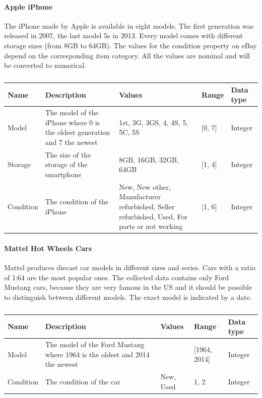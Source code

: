 \paragraph{Apple iPhone}
The iPhone made by Apple is available in eight models. The first generation was released in 2007, the last model 5s in 2013. Every model comes with different storage sizes (from 8GB to 64GB). The values for the condition property on eBay depend on the corresponding item category. All the values are nominal and will be converted to numerical.
\begin{table}[h!]
	\begin{center}
	\begin{tabular}{| l | p{5cm} | p{4cm} | l | l |}
		\hline
		Name & Description & Values & Range & Data type \\
		\hline
		Model & The model of the iPhone where 0 is the oldest generation and 7 the newest & 1st, 3G, 3GS, 4, 4S, 5, 5C, 5S & [0, 7] & Integer \\
		\hline
		Storage & The size of the storage of the smartphone & 8GB, 16GB, 32GB, 64GB & [1, 4] & Integer \\
		\hline
		Condition & The condition of the iPhone & New, New other, Manufacturer refurbished, Seller refurbished, Used, For parts or not working & [1, 6] & Integer \\
		\hline
	\end{tabular}
	\end{center}
	\caption{}
\end{table}

\paragraph{Mattel Hot Wheels Cars}
Mattel produces diecast car models in different sizes and series. Cars with a ratio of 1:64 are the most popular ones. The collected data contains only Ford Mustang cars, because they are very famous in the US and it should be possible to distinguish between different models. The exact model is indicated by a date.
\begin{table}[h!]
	\begin{center}
	\begin{tabular}{| l | p{5cm} | p{4cm} | l | l |}
		\hline
		Name & Description & Values & Range & Data type \\
		\hline
		Model & The model of the Ford Mustang where 1964 is the oldest and 2014 the newest & & [1964, 2014] & Integer \\
		\hline
		Condition & The condition of the car & New, Used & {1, 2} & Integer \\
		\hline
	\end{tabular}
	\end{center}
	\caption{}
\end{table}

